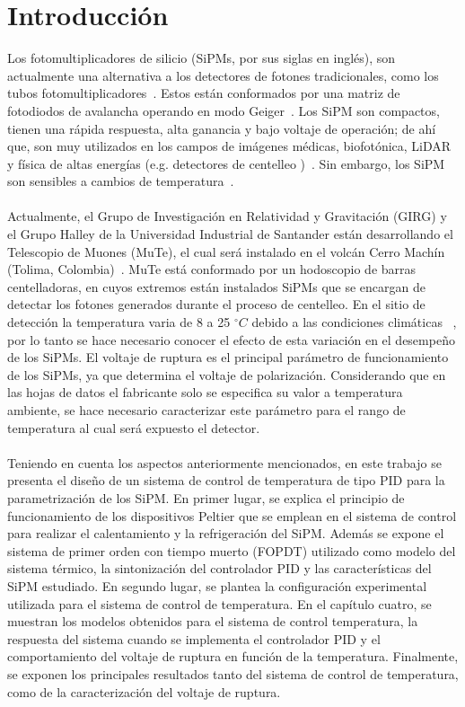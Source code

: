 \documentclass[runningheads]{llncs}
\begin{document}
\section{Introducción}
Los fotomultiplicadores de silicio (SiPMs, por sus siglas en inglés), son actualmente una alternativa a los detectores de fotones tradicionales, como los tubos fotomultiplicadores~\cite{Intro_SIPM_Sensl}. Estos están conformados por una matriz de fotodiodos de avalancha operando en modo Geiger~\cite{Sipm_S13360_1350CS_datasheet}. Los SiPM son compactos, tienen una rápida respuesta, alta ganancia y bajo voltaje de operación; de ahí que, son muy utilizados en los campos de imágenes médicas, biofotónica, LiDAR y física de altas energías (e.g. detectores de centelleo )~\cite{study_break_voltage_SIPM,Break_voltage_dif_temp_SIPM}. Sin embargo, los SiPM son sensibles a cambios de temperatura~\cite{Intro_SIPM_Sensl}.\\ \\
Actualmente, el Grupo de Investigación en Relatividad y Gravitación (GIRG) y el Grupo Halley de la Universidad Industrial de Santander están desarrollando el Telescopio de Muones (MuTe), el cual será instalado en el volcán  Cerro Machín (Tolima, Colombia)~\cite{Mute_oficial}. MuTe está conformado por un hodoscopio de barras centelladoras, en cuyos extremos están instalados SiPMs que se encargan de detectar los fotones generados durante el proceso de centelleo. En el sitio de detección la temperatura varia de 8 a 25 $^{\circ} C$ debido a las condiciones climáticas ~\cite{temp_machin}, por lo tanto se hace necesario conocer el efecto de esta variación en el desempeño de los SiPMs. El voltaje de ruptura es el principal parámetro de funcionamiento de los SiPMs, ya que determina el voltaje de polarización. Considerando  que en las hojas de datos el fabricante solo se especifica su valor a temperatura ambiente, se hace necesario caracterizar este parámetro para el rango de temperatura al cual será expuesto el detector.\\ \\%
Teniendo en cuenta los aspectos anteriormente mencionados, en este trabajo se presenta el diseño de un sistema de control de temperatura de tipo PID para la parametrización de los SiPM. En primer lugar, se explica el principio de funcionamiento de los dispositivos Peltier que se emplean en el sistema de control para realizar el calentamiento y la refrigeración del SiPM. Además se expone el sistema de primer orden con tiempo muerto (FOPDT) utilizado como modelo del sistema térmico, la sintonización del controlador PID y las características del SiPM estudiado. En segundo lugar, se plantea la configuración experimental utilizada para el sistema de control de temperatura. En el capítulo cuatro, se muestran los modelos obtenidos para el sistema de control temperatura, la respuesta del sistema cuando se implementa el controlador PID y el comportamiento del voltaje de ruptura en función de la temperatura. Finalmente, se exponen los principales resultados tanto del sistema de control de temperatura, como de la caracterización del voltaje de ruptura.\\
\end{document}
